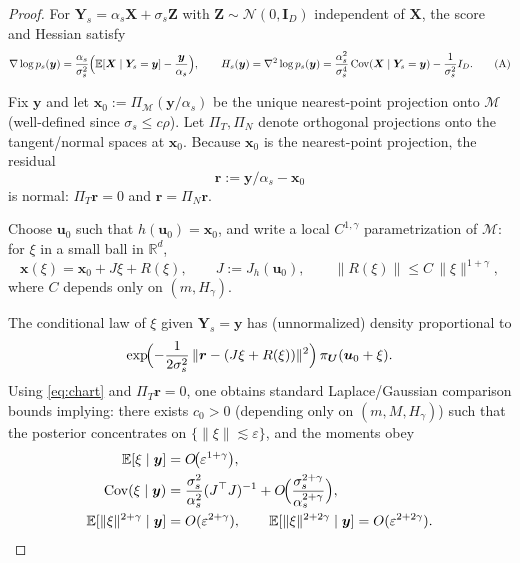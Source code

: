 \documentclass[12pt]{article}
\theoremstyle{definition} %
\newcommand{\R}{\mathbb{R}}
\newcommand{\M}{\mathcal{M}}
\newcommand{\X}{\bm X}
\newcommand{\U}{\bm U}
\newcommand{\Y}{\bm Y}
\newcommand{\Z}{\bm Z}
\newcommand{\y}{\bm y}
\newcommand{\x}{\bm x}
\newcommand{\Cov}{\operatorname{Cov}}
\providecommand{\E}{\mathbb{E}}
\begin{document}
\begin{proof}
For $\Y_s=\alpha_s \X+\sigma_s \Z$ with $\Z\sim\mathcal N(0,\bm{I}_D)$ independent of $\X$, the score and Hessian satisfy
\[
\nabla\log p_s(\y)=\frac{\alpha_s}{\sigma_s^2}\Bigl(\E[\X\mid \Y_s=\y]-\frac{\y}{\alpha_s}\Bigr),
\qquad
H_s(\y)=\nabla^2\log p_s(\y)=\frac{\alpha_s^2}{\sigma_s^4}\Cov(\X\mid \Y_s=\y)-\frac{1}{\sigma_s^2}I_D.
\tag{A}\label{eq:tweedie-hess}
\]

\smallskip
Fix $\y$ and let $\x_0:=\Pi_{\M}(\y/\alpha_s)$ be the unique nearest-point projection onto $\M$
(well-defined since $\sigma_s\le c\rho$).
Let $\Pi_T,\Pi_N$ denote orthogonal projections onto the tangent/normal spaces at $\x_0$.
Because $\x_0$ is the nearest-point projection, the residual
\[
\bm r:=\y/\alpha_s-\x_0
\]
is normal: $\Pi_T \bm r=0$ and $\bm r=\Pi_N \bm r$.

Choose $\bm u_0$ such that $h(\bm u_0)=\x_0$, and write a local $C^{1,\gamma}$ parametrization of $\M$:
for $\xi$ in a small ball in $\R^{d}$,
\[
\x(\xi)=\x_0 + J\xi + R(\xi),
\qquad
J:=J_h(\bm u_0),
\qquad
\|R(\xi)\|\le C\,\|\xi\|^{1+\gamma},
\tag{B}\label{eq:chart}
\]
where $C$ depends only on $(m,H_\gamma)$.

\smallskip
The conditional law of $\xi$ given $\Y_s=\y$ has (unnormalized) density proportional to
\[
\exp\!\Bigl(-\frac{1}{2\sigma_s^2}\,\|\bm r-(J\xi+R(\xi))\|^2\Bigr)\,\pi_{\U}(\bm u_0+\xi).
\]
Using \eqref{eq:chart} and $\Pi_T \bm r=0$, one obtains standard Laplace/Gaussian comparison bounds implying:
there exists $c_0>0$ (depending only on $(m,M,H_\gamma)$) such that the posterior concentrates on
$\{\|\xi\|\lesssim \varepsilon\}$, and the moments obey
\begin{align}
\E[\xi\mid \y] &= O\!\bigl(\varepsilon^{1+\gamma}\bigr),
\label{eq:xi-mean}\\
\Cov(\xi\mid \y)
&=\frac{\sigma_s^2}{\alpha_s^2}(J^\top J)^{-1}
+O\!\Bigl(\frac{\sigma_s^{2+\gamma}}{\alpha_s^{2+\gamma}}\Bigr),
\label{eq:xi-cov}\\
\E[\|\xi\|^{2+\gamma}\mid \y] &= O(\varepsilon^{2+\gamma}),
\qquad
\E[\|\xi\|^{2+2\gamma}\mid \y] = O(\varepsilon^{2+2\gamma}).
\label{eq:xi-mom}
\end{align}


\end{proof}
\end{document}
